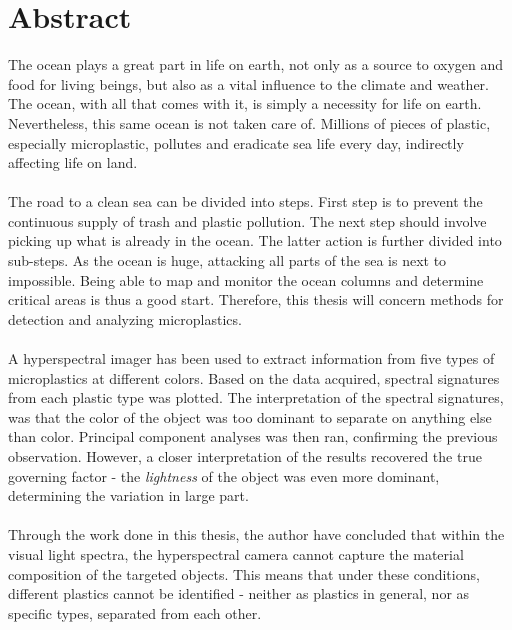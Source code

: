 \chapter*{Abstract}

The ocean plays a great part in life on earth, not only as a source to oxygen and food for living beings, but also as a vital influence to the climate and weather. The ocean, with all that comes with it, is simply a necessity for life on earth. Nevertheless, this same ocean is not taken care of. Millions of pieces of plastic, especially microplastic, pollutes and eradicate sea life every day, indirectly affecting life on land. 
\\\\
The road to a clean sea can be divided into steps. First step is to prevent the continuous supply of trash and plastic pollution. The next step should involve picking up what is already in the ocean. The latter action is further divided into sub-steps. As the ocean is huge, attacking all parts of the sea is next to impossible. Being able to map and monitor the ocean columns and determine critical areas is thus a good start. Therefore, this thesis will concern methods for detection and analyzing microplastics. 
\\\\
A hyperspectral imager has been used to extract information from five types of microplastics at different colors. Based on the data acquired, spectral signatures from each plastic type was plotted. The interpretation of the spectral signatures, was that the color of the object was too dominant to separate on anything else than color. Principal component analyses was then ran, confirming the previous observation. However, a closer interpretation of the results recovered the true governing factor - the \textit{lightness} of the object was even more dominant, determining the variation in large part. 
\\\\
Through the work done in this thesis, the author have concluded that within the visual light spectra, the hyperspectral camera cannot capture the material composition of the targeted objects. This means that under these conditions, different plastics cannot be identified - neither as plastics in general, nor as specific types, separated from each other.


\hypersetup{pageanchor=false}